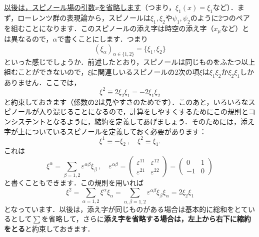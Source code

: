 \documentclass[a4paper,uplatex,dvipdfmx]{jsarticle}
\theoremstyle{definition}
\begin{document}
\uline{以後は，スピノール場の引数$x$を省略します}（つまり，$\xi_{1}(x)=\xi_{1}$など）．まず，ローレンツ群の表現論から，スピノールは$\xi_{1},\xi_{2}$や$\psi_{1},\psi_{2}$のように2つのペアを組むことになります．このスピノールの添え字は時空の添え字（$x_{\mu}$など）とは異なるので，$\alpha$で書くことにします．つまり
\begin{equation}
  (\xi_{\alpha})_{\alpha\in\{1,2\}}
  =
  \{\xi_{1},\xi_{2}\}
\end{equation}
といった感じでしょうか．前述したとおり，スピノールは同じものをふたつ以上組むことができないので，$\xi$に関連しいるスピノールの2次の項$\xi$は$\xi_{1}\xi_{2}$か$\xi_{2}\xi_{1}$しかありません．ここでは，
\begin{equation}
  \xi^2
  \equiv
  2\xi_{2}\xi_{1}
  =
  -2\xi_{1}\xi_{2}
\end{equation}
と約束しておきます（係数の2は見やすさのためです）．このあと，いろいろなスピノールが入り混じることになるので，計算をしやすくするためにこの規則とコンシステントとなるように，縮約を定義してあげましょう．そのためには，添え字が上についているスピノールを定義しておく必要があります：
\begin{equation}
  \xi^{1}
  \equiv
  -\xi_{2}
  \ ,\quad
  \xi^{2}
  \equiv
  \xi_{1}
  .
\end{equation}
これは
\begin{equation}
  \xi^{\alpha}
  =
  \sum_{\beta=1,2}
  \varepsilon^{\alpha\beta}\xi_{\beta}
  \ ,\quad
  \varepsilon^{\alpha\beta}
  =
  \begin{pmatrix}
    \varepsilon^{11} & \varepsilon^{12} \\
    \varepsilon^{21} & \varepsilon^{22}
  \end{pmatrix}
  =
  \begin{pmatrix}
    0 & 1 \\
    -1 & 0
  \end{pmatrix}
\end{equation}
と書くこともできます．この規則を用いれば
\begin{equation}
  \xi^2
  =
  \sum_{\alpha=1,2}
  \xi^{\alpha}\xi_{\alpha}
  =
  \sum_{\alpha,\beta=1,2}
  \varepsilon^{\alpha\beta}\xi_{\beta}\xi_{\alpha}
  =
  2\xi_{2}\xi_{1}
\end{equation}
となっています．以後は，添え字が同じものがある場合は基本的に総和をとているとして$\sum$を省略して，さらに\textbf{添え字を省略する場合は，左上から右下に縮約をとる}と約束しておきます．

\vspace{7pt}
\end{document}
